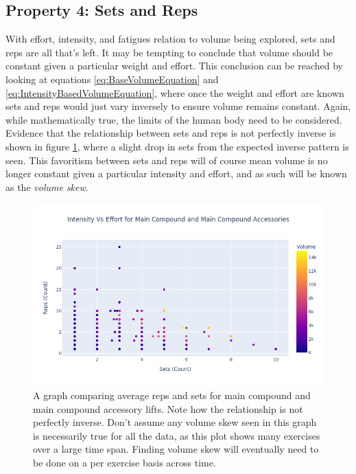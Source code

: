 \subsection{Property 4: Sets and Reps}
\label{sec:PotentialSurfaceIntuitiveRelationshipsBetweenVariablesSetsAndReps}

With effort, intensity, and fatigues relation to volume being explored, sets and reps are all that's left. It may be tempting to conclude that volume should be constant given a particular weight and effort. This conclusion can be reached by looking at equations \ref{eq:BaseVolumeEquation} and \ref{eq:IntensityBasedVolumeEquation}, where once the weight and effort are known sets and reps would just vary inversely to ensure volume remains constant. Again, while mathematically true, the limits of the human body need to be considered. Evidence that the relationship between sets and reps is not perfectly inverse is shown in figure \ref{fig:SetsVsReps}, where a slight drop in sets from the expected inverse pattern is seen. This favoritism between sets and reps will of course mean volume is no longer constant given a particular intensity and effort, and as such will be known as the \textit{volume skew}.

\begin{figure}[h]
    \centering
    \includegraphics[scale=0.55]{images/ch3/SetsVsReps.png}
    \caption{A graph comparing average reps and sets for main compound and main compound accessory lifts. Note how the relationship is not perfectly inverse. Don't assume any volume skew seen in this graph is necessarily true for all the data, as this plot shows many exercises over a large time span. Finding volume skew will eventually need to be done on a per exercise basis across time.}
    \label{fig:SetsVsReps}
\end{figure}

